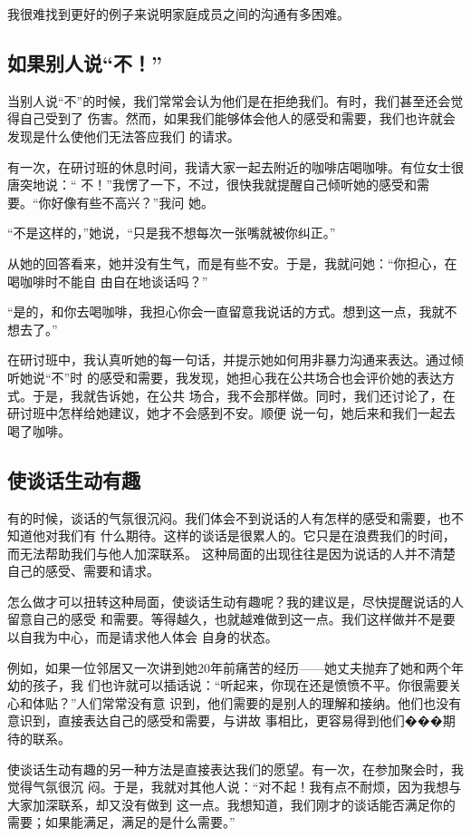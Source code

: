 \documentclass{ctexart}
\begin{document}
我很难找到更好的例子来说明家庭成员之间的沟通有多困难。


\subsection{如果别人说``不！''}

当别人说``不''的时候，我们常常会认为他们是在拒绝我们。有时，我们甚至还会觉得自己受到了
伤害。然而，如果我们能够体会他人的感受和需要，我们也许就会发现是什么使他们无法答应我们
的请求。

有一次，在研讨班的休息时间，我请大家一起去附近的咖啡店喝咖啡。有位女士很唐突地说：``
不！''我愣了一下，不过，很快我就提醒自己倾听她的感受和需要。``你好像有些不高兴？''我问
她。

``不是这样的，''她说，``只是我不想每次一张嘴就被你纠正。''

从她的回答看来，她并没有生气，而是有些不安。于是，我就问她：``你担心，在喝咖啡时不能自
由自在地谈话吗？''

``是的，和你去喝咖啡，我担心你会一直留意我说话的方式。想到这一点，我就不想去了。''

在研讨班中，我认真听她的每一句话，并提示她如何用非暴力沟通来表达。通过倾听她说``不''时
的感受和需要，我发现，她担心我在公共场合也会评价她的表达方式。于是，我就告诉她，在公共
场合，我不会那样做。同时，我们还讨论了，在研讨班中怎样给她建议，她才不会感到不安。顺便
说一句，她后来和我们一起去喝了咖啡。


\subsection{使谈话生动有趣}

有的时候，谈话的气氛很沉闷。我们体会不到说话的人有怎样的感受和需要，也不知道他对我们有
什么期待。这样的谈话是很累人的。它只是在浪费我们的时间，而无法帮助我们与他人加深联系。
这种局面的出现往往是因为说话的人并不清楚自己的感受、需要和请求。

怎么做才可以扭转这种局面，使谈话生动有趣呢？我的建议是，尽快提醒说话的人留意自己的感受
和需要。等得越久，也就越难做到这一点。我们这样做并不是要以自我为中心，而是请求他人体会
自身的状态。

例如，如果一位邻居又一次讲到她20年前痛苦的经历------她丈夫抛弃了她和两个年幼的孩子，我
们也许就可以插话说：``听起来，你现在还是愤愤不平。你很需要关心和体贴？''人们常常没有意
识到，他们需要的是别人的理解和接纳。他们也没有意识到，直接表达自己的感受和需要，与讲故
事相比，更容易得到他们���期待的联系。

使谈话生动有趣的另一种方法是直接表达我们的愿望。有一次，在参加聚会时，我觉得气氛很沉
闷。于是，我就对其他人说：``对不起！我有点不耐烦，因为我想与大家加深联系，却又没有做到
这一点。我想知道，我们刚才的谈话能否满足你的需要；如果能满足，满足的是什么需要。''
\end{document}
